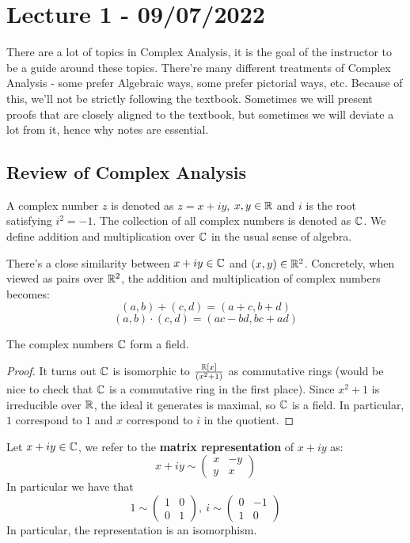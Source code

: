 \section{Lecture 1 - 09/07/2022}
There are a lot of topics in Complex Analysis, it is the goal of the instructor to be a guide around these topics. There're many different treatments of Complex Analysis - some prefer Algebraic ways, some prefer pictorial ways, etc. Because of this, we'll not be strictly following the textbook. Sometimes we will present proofs that are closely aligned to the textbook, but sometimes we will deviate a lot from it, hence why notes are essential.

\subsection{Review of Complex Analysis}

\begin{definition}
    A complex number $z$ is denoted as $z = x + iy$, $x, y \in \mathbb{R}$ and $i$ is the root satisfying $i^2 = -1$. The collection of all complex numbers is denoted as $\mathbb{C}$. We define addition and multiplication over $\mathbb{C}$ in the usual sense of algebra.
\end{definition}

    \noindent There's a close similarity between $x + iy \in \mathbb{C}$ and $(x, y) \in \mathbb{R}^2$. Concretely, when viewed as pairs over $\mathbb{R}^2$, the addition and multiplication of complex numbers becomes:
    \[(a, b) + (c, d) = (a + c, b + d)\]
    \[(a, b) \cdot (c, d) = (ac - bd, bc + ad)\]

\begin{proposition}
    The complex numbers $\mathbb{C}$ form a field.
\end{proposition}

\begin{proof}
    It turns out $\mathbb{C}$ is isomorphic to $\frac{\mathbb{R}[x]}{(x^2 + 1)}$ as commutative rings (would be nice to check that $\mathbb{C}$ is a commutative ring in the first place). Since $x^2 + 1$ is irreducible over $\mathbb{R}$, the ideal it generates is maximal, so $\mathbb{C}$ is a field. In particular, $1$ correspond to $1$ and $x$ correspond to $i$ in the quotient.
\end{proof}

\begin{definition}
    Let $x + iy \in \mathbb{C}$, we refer to the \textbf{matrix representation} of $x + iy$ as:
    \[x + iy \sim \begin{pmatrix} x & -y\\ y & x\end{pmatrix}\]
    In particular we have that
    \[1 \sim \begin{pmatrix} 1 & 0\\ 0 & 1\end{pmatrix},\ i \sim \begin{pmatrix}
    0 & -1 \\ 1 & 0
    \end{pmatrix}\]
    In particular, the representation is an isomorphism.
\end{definition}

